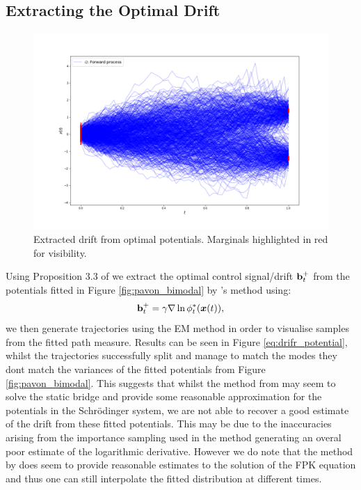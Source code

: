 \documentclass[a4paper,12pt,twoside,openright]{report}
\theoremstyle{definition}
\begin{document}
\subsection{Extracting the Optimal Drift}
\begin{figure}[t]
    \centering
    \includegraphics[scale=0.45,trim={4.3cm 1cm 2.5cm 0}, clip]{images/Pavon/pavon_trajectories_bimodal.png} 
    \caption{Extracted drift from optimal potentials. Marginals highlighted in red for visibility. }
    \label{fig:pavon_bimodal_drift}
\end{figure}
Using Proposition 3.3 of \cite{pavon1991free} we extract the optimal control signal/drift ${\mathbf{b}}_t^+$ from the potentials fitted in Figure \ref{fig:pavon_bimodal} by \cite{pavon2018data}'s method using: 
\begin{align*} 
    {\mathbf{b}}_t^{+} = \gamma \nabla \ln \phi^*_t({\bm{x}}(t) ),
\end{align*}
we then generate trajectories using the EM method in order to visualise samples from the fitted path measure. Results can be seen in Figure \ref{eq:drifr_potential}, whilst the trajectories successfully split and manage to match the modes they dont match the variances of the fitted potentials from Figure \ref{fig:pavon_bimodal}. This suggests that whilst the method from \cite{pavon2018data} may seem to solve the static bridge and provide some reasonable approximation for the potentials in the Schrödinger system, we are not able to recover a good estimate of the drift from these fitted potentials. This may be due to the inaccuracies arising from the importance sampling used in the method generating an overal poor estimate of the logarithmic derivative. However we do note that the method by \cite{pavon1991free} does seem to provide reasonable estimates to the solution of the FPK equation and thus one can still interpolate the fitted distribution at different times.
\end{document}
